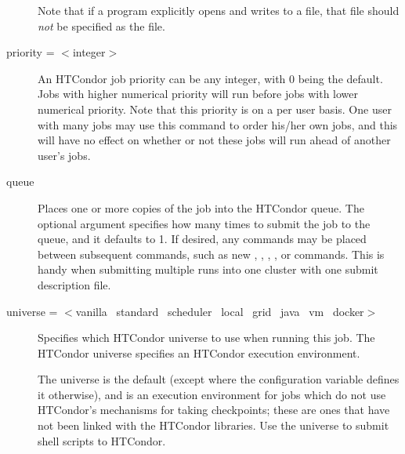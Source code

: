 \begin{description}
Note that if a program explicitly opens and writes to a file,
that file should \emph{not} be specified as the  file.


\label{man-condor-submit-priority}
\item[priority = $<$integer$>$] 
An HTCondor job priority 
can be any integer, with 0 being the default.
Jobs with higher numerical priority will
run before jobs with lower numerical priority. Note that this priority
is on a per user basis.
One user with many jobs may use this command
to order his/her own jobs,
and this will have no effect on whether or
not these jobs will run ahead of another user's jobs.


\label{man-condor-submit-queue}
\item[queue \oOptnm{number-of-procs}] Places one or more
copies of the job into the HTCondor queue.
The optional
argument  specifies how many times to submit the
job to the queue, and it defaults to 1.
If desired, any commands may be placed
between subsequent  commands, such as new ,
, , ,
or  commands.
This is handy when submitting multiple runs into one cluster with
one submit description file.


\label{man-condor-submit-universe}
\item[universe = $<$vanilla \Bar\ standard \Bar\ scheduler
\Bar\ local \Bar\ grid \Bar\ java \Bar\ vm \Bar\ docker$>$]
Specifies which HTCondor universe to use when running this job.  The HTCondor
universe specifies an HTCondor execution environment.

The  universe is the default (except where the
configuration variable  defines it
otherwise), and is an execution environment for jobs which do not
use HTCondor's mechanisms for taking checkpoints;
these are ones that have not been linked with the HTCondor libraries.  
Use the  universe to submit shell scripts to HTCondor.


\end{description}
